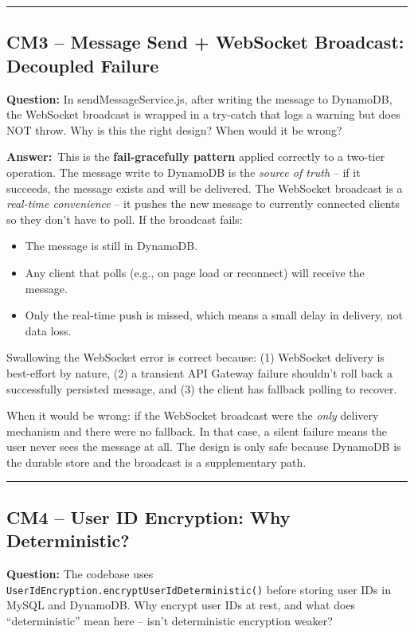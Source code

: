 \documentclass[letterpaper,10pt]{article}
\newlength{\boxwidth}
\newcommand{\questionbox}[1]{%
  \vspace{6pt}%
  \noindent\colorbox{qbg}{%
    \begin{minipage}{\boxwidth}%
      \vspace{3pt}\textbf{\textcolor{nordblue}{Question:}} #1\vspace{3pt}%
    \end{minipage}%
  }\vspace{2pt}%
}
\newcommand{\answerlabel}{\noindent\textbf{\textcolor{answerblue}{Answer:}}~}
\begin{document}
\medskip\rule{\linewidth}{0.2pt}

\subsection*{CM3 -- Message Send + WebSocket Broadcast: Decoupled Failure}

\questionbox{In sendMessageService.js, after writing the message to DynamoDB, the WebSocket broadcast is wrapped in a try-catch that logs a warning but does NOT throw. Why is this the right design? When would it be wrong?}

\answerlabel This is the \textbf{fail-gracefully pattern} applied correctly to a two-tier operation. The message write to DynamoDB is the \textit{source of truth} -- if it succeeds, the message exists and will be delivered. The WebSocket broadcast is a \textit{real-time convenience} -- it pushes the new message to currently connected clients so they don't have to poll. If the broadcast fails:

\begin{itemize}[leftmargin=*, itemsep=0pt]
  \item The message is still in DynamoDB.
  \item Any client that polls (e.g., on page load or reconnect) will receive the message.
  \item Only the real-time push is missed, which means a small delay in delivery, not data loss.
\end{itemize}

Swallowing the WebSocket error is correct because: (1) WebSocket delivery is best-effort by nature, (2) a transient API Gateway failure shouldn't roll back a successfully persisted message, and (3) the client has fallback polling to recover.

When it would be wrong: if the WebSocket broadcast were the \textit{only} delivery mechanism and there were no fallback. In that case, a silent failure means the user never sees the message at all. The design is only safe because DynamoDB is the durable store and the broadcast is a supplementary path.

\medskip\rule{\linewidth}{0.2pt}

\subsection*{CM4 -- User ID Encryption: Why Deterministic?}

\questionbox{The codebase uses \texttt{UserIdEncryption.encryptUserIdDeterministic()} before storing user IDs in MySQL and DynamoDB. Why encrypt user IDs at rest, and what does ``deterministic'' mean here -- isn't deterministic encryption weaker?}
\end{document}
